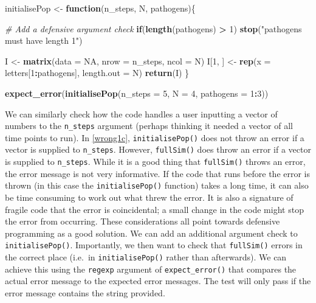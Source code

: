\documentclass[]{elsarticle} %
\newenvironment{Shaded}{\begin{snugshade}}{\end{snugshade}}
\newcommand{\CommentTok}[1]{\textcolor[rgb]{0.56,0.35,0.01}{\textit{#1}}}
\newcommand{\ControlFlowTok}[1]{\textcolor[rgb]{0.13,0.29,0.53}{\textbf{#1}}}
\newcommand{\DataTypeTok}[1]{\textcolor[rgb]{0.13,0.29,0.53}{#1}}
\newcommand{\DecValTok}[1]{\textcolor[rgb]{0.00,0.00,0.81}{#1}}
\newcommand{\KeywordTok}[1]{\textcolor[rgb]{0.13,0.29,0.53}{\textbf{#1}}}
\newcommand{\NormalTok}[1]{#1}
\newcommand{\OperatorTok}[1]{\textcolor[rgb]{0.81,0.36,0.00}{\textbf{#1}}}
\newcommand{\OtherTok}[1]{\textcolor[rgb]{0.56,0.35,0.01}{#1}}
\newcommand{\StringTok}[1]{\textcolor[rgb]{0.31,0.60,0.02}{#1}}
\begin{document}
\begin{Shaded}
\begin{Highlighting}[]
\NormalTok{initialisePop <-}\StringTok{ }\ControlFlowTok{function}\NormalTok{(n_steps, N, pathogens)\{}
  
  \CommentTok{# Add a defensive argument check}
  \ControlFlowTok{if}\NormalTok{(}\KeywordTok{length}\NormalTok{(pathogens) }\OperatorTok{>}\StringTok{ }\DecValTok{1}\NormalTok{) }\KeywordTok{stop}\NormalTok{(}\StringTok{"pathogens must have length 1"}\NormalTok{)}
  
\NormalTok{  I <-}\StringTok{ }\KeywordTok{matrix}\NormalTok{(}\DataTypeTok{data =} \OtherTok{NA}\NormalTok{, }\DataTypeTok{nrow =}\NormalTok{ n_steps, }\DataTypeTok{ncol =}\NormalTok{ N)}
\NormalTok{  I[}\DecValTok{1}\NormalTok{, ] <-}\StringTok{ }\KeywordTok{rep}\NormalTok{(}\DataTypeTok{x =}\NormalTok{ letters[}\DecValTok{1}\OperatorTok{:}\NormalTok{pathogens], }\DataTypeTok{length.out =}\NormalTok{ N)}
  \KeywordTok{return}\NormalTok{(I)}
\NormalTok{\}}

\KeywordTok{expect_error}\NormalTok{(}\KeywordTok{initialisePop}\NormalTok{(}\DataTypeTok{n_steps =} \DecValTok{5}\NormalTok{, }\DataTypeTok{N =} \DecValTok{4}\NormalTok{, }\DataTypeTok{pathogens =} \DecValTok{1}\OperatorTok{:}\DecValTok{3}\NormalTok{))}
\end{Highlighting}
\end{Shaded}

We can similarly check how the code handles a user inputting a vector of numbers to the \texttt{n\_steps} argument (perhaps thinking it needed a vector of all time points to run).
In \ref{wrong1c}, \texttt{initialisePop()} does not throw an error if a vector is supplied to \texttt{n\_steps}.
However, \texttt{fullSim()} does throw an error if a vector is supplied to \texttt{n\_steps}.
While it is a good thing that \texttt{fullSim()} throws an error, the error message is not very informative.
If the code that runs before the error is thrown (in this case the \texttt{initialisePop()} function) takes a long time, it can also be time consuming to work out what threw the error.
It is also a signature of fragile code that the error is coincidental; a small change in the code might stop the error from occurring.
These considerations all point towards defensive programming as a good solution.
We can add an additional argument check to \texttt{initialisePop()}.
Importantly, we then want to check that \texttt{fullSim()} errors in the correct place (i.e.~in \texttt{initialisePop()} rather than afterwards).
We can achieve this using the \texttt{regexp} argument of \texttt{expect\_error()} that compares the actual error message to the expected error messages.
The test will only pass if the error message contains the string provided.
\newline
{}\label{wrong2}
\end{document}
